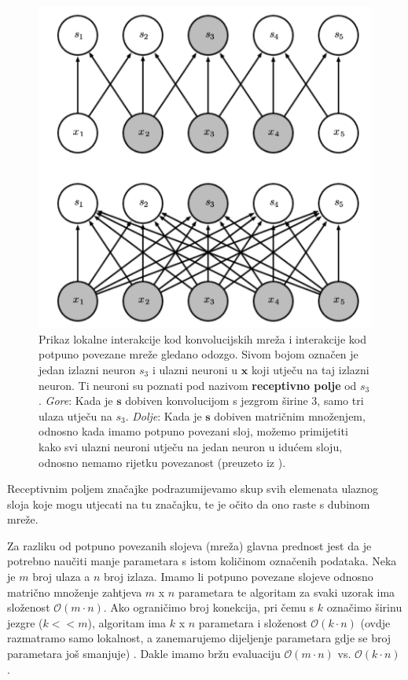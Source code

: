 \documentclass[times, utf8, diplomski]{fer}
\theoremstyle{definition}
\begin{document}
\begin{figure}[!htb]
\centering
\includegraphics[scale=0.25]{lokalna_povetanost_odozgo.png}
\caption{Prikaz lokalne interakcije kod konvolucijskih mreža i interakcije kod potpuno povezane mreže gledano odozgo. Sivom bojom označen je jedan izlazni neuron $s_3$ i ulazni neuroni u $\bm{x}$ koji utječu na taj izlazni neuron. Ti neuroni su poznati pod nazivom \textbf{receptivno polje}  od $s_3$. \textit{Gore}: Kada je $\bm{s}$ dobiven konvolucijom s jezgrom širine 3, samo tri ulaza utječu na $s_3$. \textit{Dolje}: Kada je $\bm{s}$ dobiven matričnim množenjem, odnosno kada imamo potpuno povezani sloj, možemo primijetiti kako svi ulazni neuroni utječu na jedan neuron u idućem sloju, odnosno nemamo rijetku povezanost (preuzeto iz \cite{Goodfellow-et-al-2016}). }
\end{figure}
Receptivnim poljem značajke podrazumijevamo skup svih elemenata ulaznog sloja koje mogu utjecati na tu značajku, te je očito da ono raste s dubinom mreže.\newline

Za razliku od potpuno povezanih slojeva (mreža) glavna prednost jest da je potrebno naučiti manje parametara s istom količinom označenih podataka. Neka je $m$ broj ulaza a $n$ broj izlaza. Imamo li potpuno povezane slojeve odnosno matrično množenje zahtjeva $m$ x $n$ parametara te algoritam za svaki uzorak ima složenost $\mathcal{O}(m \cdot n)$. Ako ograničimo broj konekcija, pri čemu s $k$ označimo širinu jezgre ($k << m$), algoritam ima $k$ x $n$ parametara i složenost $\mathcal{O}(k \cdot n)$ (ovdje razmatramo samo lokalnost, a zanemarujemo dijeljenje parametara gdje se broj parametara još smanjuje) . Dakle imamo bržu evaluaciju $\mathcal{O}(m\cdot n)$ vs. $\mathcal{O}(k\cdot n)$.
\end{document}
